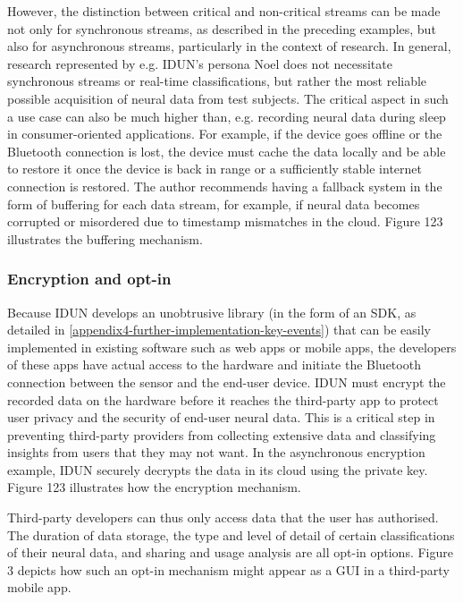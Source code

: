 However, the distinction between critical and non-critical streams can be made not only for synchronous streams, as described in the preceding examples, but also for asynchronous streams, particularly in the context of research. In general, research represented by e.g. IDUN's persona Noel does not necessitate synchronous streams or real-time classifications, but rather the most reliable possible acquisition of neural data from test subjects. The critical aspect in such a use case can also be much higher than, e.g. recording neural data during sleep in consumer-oriented applications. For example, if the device goes offline or the Bluetooth connection is lost, the device must cache the data locally and be able to restore it once the device is back in range or a sufficiently stable internet connection is restored. The author recommends having a fallback system in the form of buffering for each data stream, for example, if neural data becomes corrupted or misordered due to timestamp mismatches in the cloud. Figure 123 illustrates the buffering mechanism.


\subsubsection{Encryption and opt-in}
\label{chapter5-user-side-opt-in}

Because IDUN develops an unobtrusive library (in the form of an SDK, as detailed in \autoref{appendix4-further-implementation-key-events}) that can be easily implemented in existing software such as web apps or mobile apps, the developers of these apps have actual access to the hardware and initiate the Bluetooth connection between the sensor and the end-user device. IDUN must encrypt the recorded data on the hardware before it reaches the third-party app to protect user privacy and the security of end-user neural data. This is a critical step in preventing third-party providers from collecting extensive data and classifying insights from users that they may not want. In the asynchronous encryption example, IDUN securely decrypts the data in its cloud using the private key. Figure 123 illustrates how the encryption mechanism.


Third-party developers can thus only access data that the user has authorised. The duration of data storage, the type and level of detail of certain classifications of their neural data, and sharing and usage analysis are all opt-in options. Figure 3 depicts how such an opt-in mechanism might appear as a GUI in a third-party mobile app.

